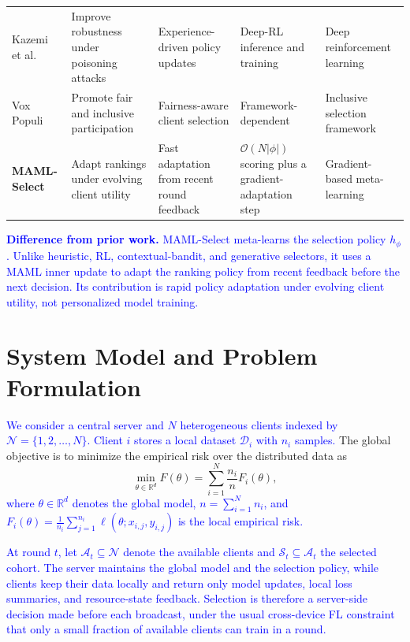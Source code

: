 \documentclass[journal]{IEEEtran}
\newcommand{\revision}[1]{\textcolor{blue}{#1}}
\begin{document}
\begin{table}[!t]
\begin{tabularx}{\textwidth}{lXXXX}
        Kazemi et al.~\cite{kazemi2026robust} & Improve robustness under poisoning attacks & Experience-driven policy updates & Deep-RL inference and training & Deep reinforcement learning \\
        Vox Populi~\cite{arisdakessian2026vox} & Promote fair and inclusive participation & Fairness-aware client selection & Framework-dependent & Inclusive selection framework \\
        \textbf{MAML-Select} & Adapt rankings under evolving client utility & Fast adaptation from recent round feedback & $\mathcal{O}(N|\phi|)$ scoring plus a gradient-adaptation step & Gradient-based meta-learning \\
        \bottomrule
    \end{tabularx}
\end{table}

\revision{\textbf{Difference from prior work.} MAML-Select meta-learns the selection policy $h_\phi$. Unlike heuristic, RL, contextual-bandit, and generative selectors, it uses a MAML inner update to adapt the ranking policy from recent feedback before the next decision. Its contribution is rapid policy adaptation under evolving client utility, not personalized model training.}

\section{System Model and Problem Formulation}
\revision{We consider a central server and $N$ heterogeneous clients indexed by $\mathcal{N} = \{1, 2, \ldots, N\}$. Client $i$ stores a local dataset $\mathcal{D}_i$ with $n_i$ samples.} The global objective is to minimize the empirical risk over the distributed data as
\begin{equation}
	\min_{\theta \in \mathbb{R}^d} F(\theta) = \sum_{i=1}^{N} \frac{n_i}{n} F_i(\theta),
	\label{eq:global_objective}
\end{equation}
\revision{where $\theta \in \mathbb{R}^d$ denotes the global model, $n = \sum_{i=1}^{N} n_i$, and $F_i(\theta) = \frac{1}{n_i} \sum_{j=1}^{n_i} \ell(\theta; x_{i,j}, y_{i,j})$ is the local empirical risk.}

\revision{At round $t$, let $\mathcal{A}_t \subseteq \mathcal{N}$ denote the available clients and $\mathcal{S}_t \subseteq \mathcal{A}_t$ the selected cohort. The server maintains the global model and the selection policy, while clients keep their data locally and return only model updates, local loss summaries, and resource-state feedback. Selection is therefore a server-side decision made before each broadcast, under the usual cross-device FL constraint that only a small fraction of available clients can train in a round.}
\end{document}
